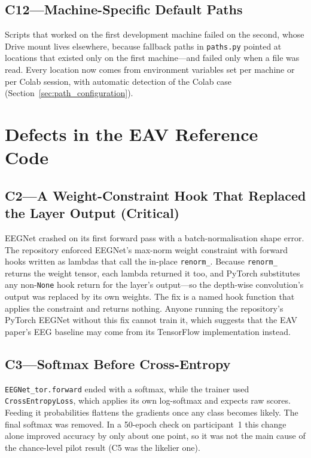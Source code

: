 \subsection*{C12---Machine-Specific Default Paths}
Scripts that worked on the first development machine failed on the second, whose Drive mount lives elsewhere, because fallback paths in \texttt{paths.py} pointed at locations that existed only on the first machine---and failed only when a file was read. Every location now comes from environment variables set per machine or per Colab session, with automatic detection of the Colab case (Section~\ref{sec:path_configuration}).

\section{Defects in the EAV Reference Code}

\subsection*{C2---A Weight-Constraint Hook That Replaced the Layer Output (Critical)}
EEGNet crashed on its first forward pass with a batch-normalisation shape error. The repository enforced EEGNet's max-norm weight constraint with forward hooks written as lambdas that call the in-place \texttt{renorm\_}. Because \texttt{renorm\_} returns the weight tensor, each lambda returned it too, and PyTorch substitutes any non-\texttt{None} hook return for the layer's output---so the depth-wise convolution's output was replaced by its own weights. The fix is a named hook function that applies the constraint and returns nothing. Anyone running the repository's PyTorch EEGNet without this fix cannot train it, which suggests that the EAV paper's EEG baseline may come from its TensorFlow implementation instead.

\subsection*{C3---Softmax Before Cross-Entropy}
\texttt{EEGNet\_tor.forward} ended with a softmax, while the trainer used \texttt{CrossEntropyLoss}, which applies its own log-softmax and expects raw scores. Feeding it probabilities flattens the gradients once any class becomes likely. The final softmax was removed. In a 50-epoch check on participant~1 this change alone improved accuracy by only about one point, so it was not the main cause of the chance-level pilot result (C5 was the likelier one).

